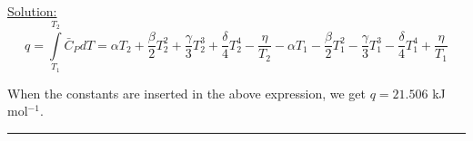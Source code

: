 \noindent
\underline{Solution:}\\

$$q = \int\limits_{T_1}^{T_2}\bar{C}_PdT = \alpha T_2 + \frac{\beta}{2} T_2^2 + \frac{\gamma}{3} T_2^3 + \frac{\delta}{4} T_2^4 - \frac{\eta}{T_2} - \alpha T_1 - \frac{\beta}{2} T_1^2 - \frac{\gamma}{3} T_1^3 - \frac{\delta}{4} T_1^4 + \frac{\eta}{T_1}$$

When the constants are inserted in the above expression, we get $q = 21.506$ kJ mol$^{-1}$.

\hrule\vspace{0.5cm}
